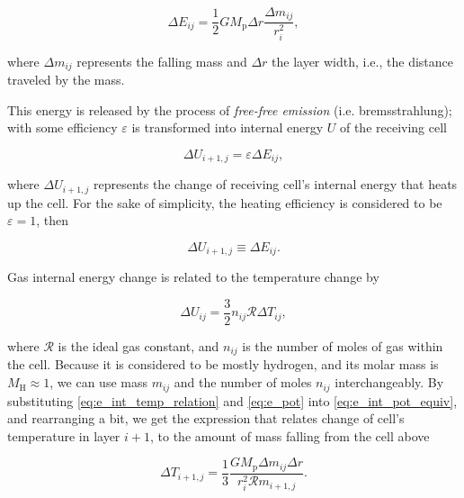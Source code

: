     \begin{equation}
    \Delta E_{ij} = \frac{1}{2} G M_{\mathrm{p}} \Delta r \frac{\Delta m_{ij}}{r_i^2},
    \label{eq:e_pot}
    \end{equation}

    where $\Delta m_{ij}$ represents the falling mass and $\Delta r$ the layer width, i.e., the distance traveled by the mass. 

    This energy is released by the process of \emph{free-free emission} (i.e. bremsstrahlung); with some efficiency $\varepsilon$ is transformed into internal energy $U$ of the receiving cell

    \begin{equation}
        \Delta U_{i+1,j} = \varepsilon \Delta E_{ij},
    \end{equation}

    where $\Delta U_{i+1,j}$ represents the change of receiving cell's internal energy that heats up the cell. For the sake of simplicity, the heating efficiency is considered to be ${\varepsilon=1}$, then  

    \begin{equation}
        \Delta U_{i+1,j} \equiv \Delta E_{ij}.
        \label{eq:e_int_pot_equiv}
    \end{equation} 

    Gas internal energy change is related to the temperature change by

    \begin{equation}
        \Delta U_{ij} = \frac{3}{2} n_{ij} \mathcal{R} \Delta T_{ij},
        \label{eq:e_int_temp_relation}
    \end{equation}

    where $\mathcal{R}$ is the ideal gas constant, and $n_{ij}$ is the number of moles of gas within the cell. Because it is considered to be mostly hydrogen, and its molar mass is $M_{\mathrm{H}} \approx 1$, we can use mass $m_{ij}$ and the number of moles $n_{ij}$ interchangeably. By substituting \eqref{eq:e_int_temp_relation} and \eqref{eq:e_pot} into \eqref{eq:e_int_pot_equiv}, and rearranging a bit, we get the expression that relates change of cell's temperature in layer $i+1$, to the amount of mass falling from the cell above

    \begin{equation}
        \Delta T_{i+1,j} = \frac{1}{3} \frac{G M_{\mathrm{p}} \Delta m_{ij} \Delta r}{r_{i}^2 \mathcal{R} m_{i+1,j}}.
        \label{eq:temp_ff_final}
    \end{equation}

